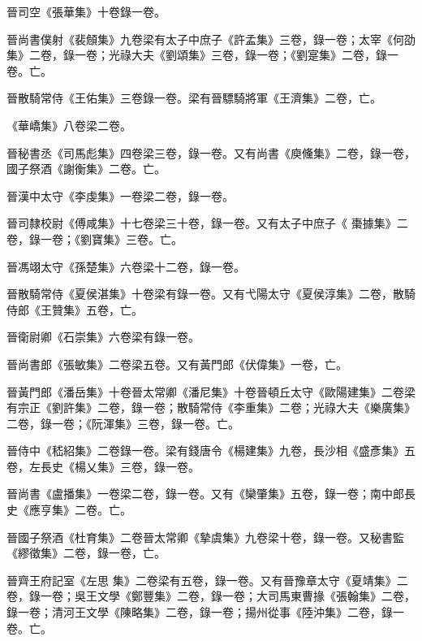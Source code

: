 \begin{pinyinscope}
 晉司空《張華集》十卷錄一卷。



 晉尚書僕射《裴頠集》九卷梁有太子中庶子《許孟集》三卷，錄一卷；太宰《何劭集》二卷，錄一卷；光祿大夫《劉頌集》三卷，錄一卷；《劉寔集》二卷，錄一卷。亡。



 晉散騎常侍《王佑集》三卷錄一卷。梁有晉驃騎將軍《王濟集》二卷，亡。



 《華嶠集》八卷梁二卷。



 晉秘書丞《司馬彪集》四卷梁三卷，錄一卷。又有尚書《庾儵集》二卷，錄一卷，國子祭酒《謝衡集》二卷。亡。



 晉漢中太守《李虔集》一卷梁二卷，錄一卷。



 晉司隸校尉《傅咸集》十七卷梁三十卷，錄一卷。又有太子中庶子《
 棗據集》二卷，錄一卷；《劉寶集》三卷。亡。



 晉馮翊太守《孫楚集》六卷梁十二卷，錄一卷。



 晉散騎常侍《夏侯湛集》十卷梁有錄一卷。又有弋陽太守《夏侯淳集》二卷，散騎侍郎《王贊集》五卷，亡。



 晉衛尉卿《石崇集》六卷梁有錄一卷。



 晉尚書郎《張敏集》二卷梁五卷。又有黃門郎《伏偉集》一卷，亡。



 晉黃門郎《潘岳集》十卷晉太常卿《潘尼集》十卷晉頓丘太守《歐陽建集》二卷梁有宗正《劉許集》二卷，錄一卷；散騎常侍《李重集》二卷；光祿大夫《樂廣集》二卷，錄一卷；《阮渾集》三卷，錄一卷。亡。



 晉侍中《嵇紹集》二卷錄一卷。梁有錢唐令《楊建集》九卷，長沙相《盛彥集》五卷，左長史《楊乂集》三卷，錄一卷。



 晉尚書《盧播集》一卷梁二卷，錄一卷。又有《欒肇集》五卷，錄一卷；南中郎長史《應亨集》二卷。亡。



 晉國子祭酒《杜育集》二卷晉太常卿《摯虞集》九卷梁十卷，錄一卷。又秘書監《繆徵集》二卷，錄一卷，亡。



 晉齊王府記室《左思
 集》二卷梁有五卷，錄一卷。又有晉豫章太守《夏靖集》二卷，錄一卷；吳王文學《鄭豐集》二卷，錄一卷；大司馬東曹掾《張翰集》二卷，錄一卷；清河王文學《陳略集》二卷，錄一卷；揚州從事《陸沖集》二卷，錄一卷。亡。




\end{pinyinscope}
